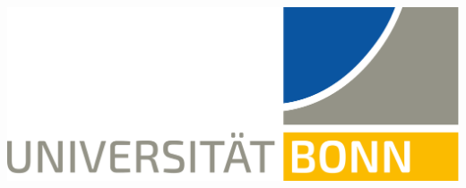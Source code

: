 \begin{titlepage}
\includegraphics[width=6 cm]{logo.png}\\[1cm] %
 

\vfill %

\end{titlepage}
\tableofcontents
\clearpage
\clearpage
\setcounter{page}{1}



\printbibliography
